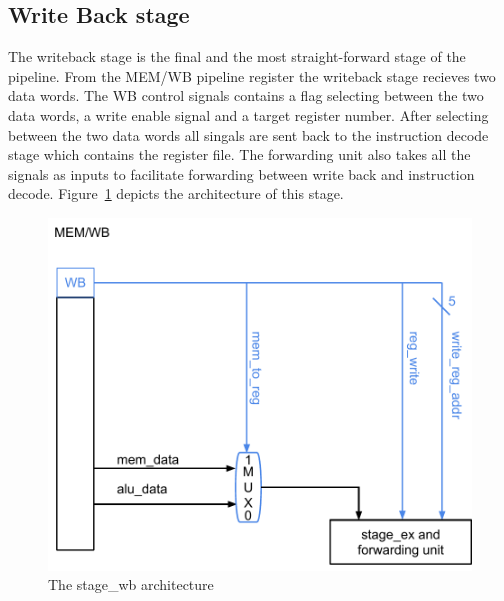 \subsection{Write Back stage}

The writeback stage is the final and the most straight-forward 
stage of the pipeline. From the MEM/WB pipeline register the writeback stage
recieves two data words. The WB control signals contains a flag selecting
between the two data words, a write enable signal and a target register
number. After selecting between the two data words all singals are sent
back to the instruction decode stage which contains the register file. The forwarding
unit also takes all the signals as inputs to facilitate forwarding between
write back and instruction decode. Figure~\ref{fig:stage_wb} depicts the architecture of this stage. 

\begin{figure}[h]
        \centering\includegraphics[scale=0.5]{figures/stage_wb}
        \caption{The stage\_wb architecture}
        \label{fig:stage_wb}
\end{figure}